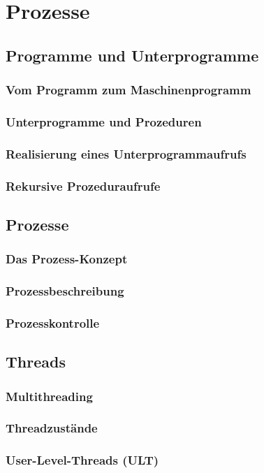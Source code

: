 \documentclass{article}
\begin{document}
\newpage
\section{Prozesse}
\subsection{Programme und Unterprogramme}
\subsubsection{Vom Programm zum Maschinenprogramm}
\subsubsection{Unterprogramme und Prozeduren}
\subsubsection{Realisierung eines Unterprogrammaufrufs}
\subsubsection{Rekursive Prozeduraufrufe}
\subsection{Prozesse}
\subsubsection{Das Prozess-Konzept}
\subsubsection{Prozessbeschreibung}
\subsubsection{Prozesskontrolle}
\subsection{Threads}
\subsubsection{Multithreading}
\subsubsection{Threadzustände}
\subsubsection{User-Level-Threads (ULT)}
\end{document}
